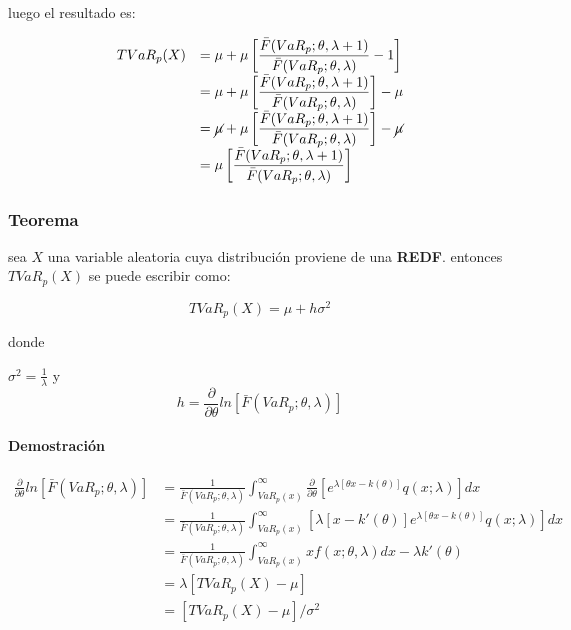 \documentclass[10pt,]{article}
\begin{document}
luego el resultado es:

\[\begin{array}{rl}
TVaR_p(X) &\displaystyle= \mu + \mu \left[\frac{\bar{F}(VaR_p;\theta,\lambda+1)}{\bar{F}(VaR_p;\theta,\lambda)} - 1\right]\\
&\displaystyle= \mu + \mu \left[\frac{\bar{F}(VaR_p;\theta,\lambda+1)}{\bar{F}(VaR_p;\theta,\lambda)} \right]-\mu\\
&\displaystyle= \cancel{\mu} + \mu \left[\frac{\bar{F}(VaR_p;\theta,\lambda+1)}{\bar{F}(VaR_p;\theta,\lambda)} \right]-\cancel{\mu}\\
&\displaystyle=\mu \left[\frac{\bar{F}(VaR_p;\theta,\lambda+1)}{\bar{F}(VaR_p;\theta,\lambda)} \right]
\end{array}\]

\hypertarget{teorema-2}{%
\subsubsection{Teorema}\label{teorema-2}}

sea \(X\) una variable aleatoria cuya distribución proviene de una
\textbf{REDF}. entonces \(TVaR_p(X)\) se puede escribir como:

\[TVaR_p(X)= \mu + h \sigma^2\]

donde

\(\sigma^2 = \frac{1}{\lambda}\) y\\
\[h=\frac{\partial}{\partial \theta}ln[\bar{F}(VaR_p; \theta, \lambda)]\]

\hypertarget{demostracion-2}{%
\paragraph{Demostración}\label{demostracion-2}}

\[\begin{array}{rl}
\frac{\partial}{\partial \theta}ln[\bar{F}(VaR_p; \theta, \lambda)] &\displaystyle= \frac{1}{\bar{F}(VaR_p;\theta,\lambda)}  \int_{VaR_p(x)}^{\infty}\frac{\partial}{\partial \theta} \left[e^{\lambda[\theta x - k(\theta)]} q(x;\lambda)\right]dx \\
&\displaystyle= \frac{1}{\bar{F}(VaR_p;\theta,\lambda)}  \int_{VaR_p(x)}^{\infty} \left[\lambda[x - k'(\theta)]e^{\lambda[\theta x - k(\theta)]} q(x;\lambda)\right]dx\\
&\displaystyle= \frac{1}{\bar{F}(VaR_p;\theta,\lambda)} \int_{VaR_p(x)}^{\infty} x f(x;\theta , \lambda)dx - \lambda k'(\theta)\\
&\displaystyle= \lambda [ TVaR_p(X) - \mu ]\\
&\displaystyle= [ TVaR_p(X) - \mu]/  \sigma^2
\end{array}\]
\end{document}
